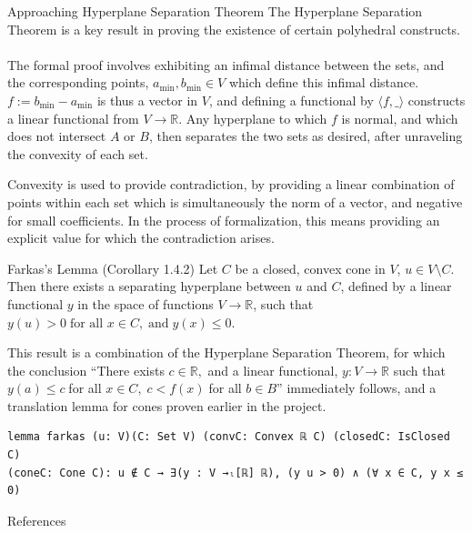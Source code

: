\documentclass[final]{beamer}
\newlength{\colwidth}
\begin{document}
\begin{frame}[fragile]
\begin{columns}[t]
\begin{column}{\colwidth}
        \begin{block}{Approaching Hyperplane Separation Theorem }
            The Hyperplane Separation Theorem is a key result in proving the existence of certain polyhedral constructs.
            \\\\The formal proof involves exhibiting an infimal distance between the sets, and the corresponding points, $a_{\text{min}}, b_{\text{min}} \in V$ which define this infimal distance.
            $f:= b_{\text{min}}-a_{\text{min}}$ is thus a vector in $V$, and defining a functional by $\langle f, \_\rangle$ constructs a linear functional from $V\to \mathbb{R}$. Any hyperplane to which $f$
            is normal, and which does not intersect $A$ or $B$, then separates the two sets as desired, after unraveling the convexity of each set.
            
            Convexity is used to provide contradiction, by providing a linear combination of points within each set which is simultaneously the norm of a vector,
            and negative for small coefficients. In the process of formalization, this means providing an explicit value for which the contradiction arises.         
        \end{block}
        
         
        \begin{exampleblock}{Farkas's Lemma (Corollary 1.4.2)}
          Let $C$ be a closed, convex cone in $V$, $u\in V\setminus C$. Then there exists a separating hyperplane between $u$ and $C$, defined by a linear functional $y$ in the space of functions $V\to \mathbb{R}$, such that $
          y(u)> 0 \; \text{for all } x\in C, \; \text{and} \; y(x) \le 0
          $.
        \end{exampleblock}
            This result is  a combination of the Hyperplane Separation Theorem, for which the conclusion ``There exists $
              c\in \mathbb{R}, $ and a linear functional, $ y: V\to \mathbb{R} $ such that $ y(a) \le c\; $for all $ x\in C, \; c < f(x)\; $for all $  b\in B
            $'' immediately follows, and a translation lemma for cones proven earlier in the project.
\begin{Verbatim}
lemma farkas (u: V)(C: Set V) (convC: Convex ℝ C) (closedC: IsClosed C)
(coneC: Cone C): u ∉ C → ∃(y : V →ₗ[ℝ] ℝ), (y u > 0) ∧ (∀ x ∈ C, y x ≤ 0)
\end{Verbatim}  
           
            
        \begin{block}{References}
        \nocite{liunotes}
        \begin{bibdiv}
        \begin{biblist}
        \end{biblist}
        \end{bibdiv}
        \end{block}
\end{column}


\end{columns}
\end{frame}
\end{document}
